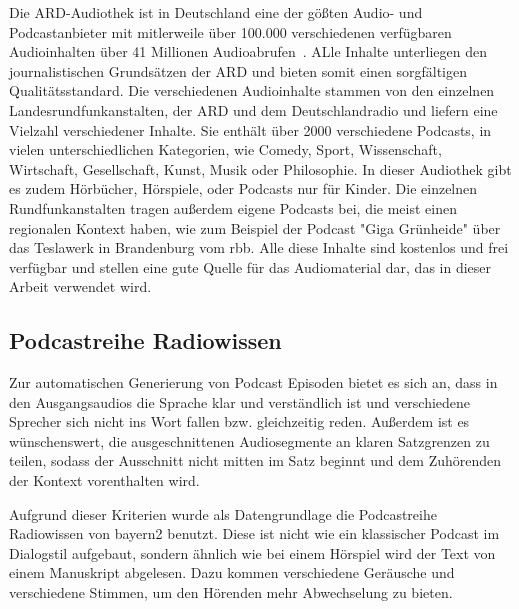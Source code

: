 Die ARD-Audiothek ist in Deutschland eine der gößten Audio- und Podcastanbieter mit mitlerweile über 100.000 verschiedenen verfügbaren Audioinhalten über 41 Millionen Audioabrufen~\cite{statista-a}.
ALle Inhalte unterliegen den journalistischen Grundsätzen der ARD und bieten somit einen sorgfältigen Qualitätsstandard. 
Die verschiedenen Audioinhalte stammen von den einzelnen Landesrundfunkanstalten, der ARD und dem Deutschlandradio und liefern eine Vielzahl verschiedener Inhalte.
Sie enthält über 2000 verschiedene Podcasts, in vielen unterschiedlichen Kategorien, wie Comedy, Sport, Wissenschaft, Wirtschaft, Gesellschaft, Kunst, Musik oder Philosophie. 
In dieser Audiothek gibt es zudem Hörbücher, Hörspiele, oder Podcasts nur für Kinder.
Die einzelnen Rundfunkanstalten tragen außerdem eigene Podcasts bei, die meist einen regionalen Kontext haben, wie zum Beispiel der Podcast "Giga Grünheide" über das Teslawerk in Brandenburg vom rbb.
Alle diese Inhalte sind kostenlos und frei verfügbar und stellen eine gute Quelle für das Audiomaterial dar, das in dieser Arbeit verwendet wird.







\subsection{Podcastreihe Radiowissen}

Zur automatischen Generierung von Podcast Episoden bietet es sich an, dass in den Ausgangsaudios die Sprache klar und verständlich ist und verschiedene Sprecher sich nicht ins Wort fallen bzw. gleichzeitig reden.
Außerdem ist es wünschenswert, die ausgeschnittenen Audiosegmente an klaren Satzgrenzen zu teilen, sodass der Ausschnitt nicht mitten im Satz beginnt und dem Zuhörenden der Kontext vorenthalten wird. 

Aufgrund dieser Kriterien wurde als Datengrundlage die Podcastreihe Radiowissen von bayern2 benutzt. 
Diese ist nicht wie ein klassischer Podcast im Dialogstil aufgebaut, sondern ähnlich wie bei einem Hörspiel wird der Text von einem Manuskript abgelesen. 
Dazu kommen verschiedene Geräusche und verschiedene Stimmen, um den Hörenden mehr Abwechselung zu bieten.


